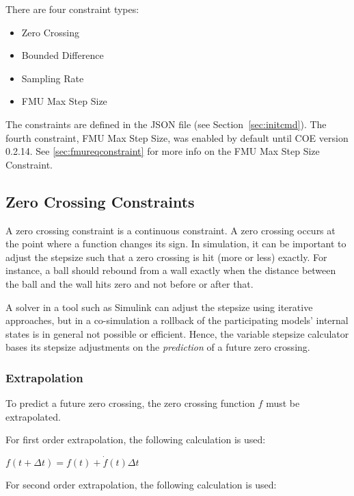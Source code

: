 \noindent There are four constraint types:

\begin{itemize}
	\item Zero Crossing
	\item Bounded Difference
	\item Sampling Rate
	\item FMU Max Step Size
\end{itemize}

\noindent The constraints are defined in the JSON file (see Section~\ref{sec:initcmd}). The fourth constraint, FMU Max Step Size, was enabled by default until COE version 0.2.14. See \autoref{sec:fmureqconstraint} for more info on the FMU Max Step Size Constraint.

\subsection{Zero Crossing Constraints}

A zero crossing constraint is a continuous constraint. A zero crossing occurs at the point where a function changes its sign. In simulation, it can be important to adjust the stepsize such that a zero crossing is hit (more or less) exactly. For instance, a ball should rebound from a wall exactly when the distance between the ball and the wall hits zero and not before or after that.

\noindent A solver in a tool such as Simulink can adjust the stepsize using iterative approaches, but in a co-simulation a rollback of the participating models' internal states is in general not possible or efficient. Hence, the variable stepsize calculator bases its stepsize adjustments on the \textit{prediction} of a future zero crossing.


\subsubsection{Extrapolation}\label{sec:extrapolation}

To predict a future zero crossing, the zero crossing function $f$ must be extrapolated.

\noindent For first order extrapolation, the following calculation is used:

$f(t+\Delta t) = f(t) + \dot{f}(t) \Delta t$

\noindent For second order extrapolation, the following calculation is used:

